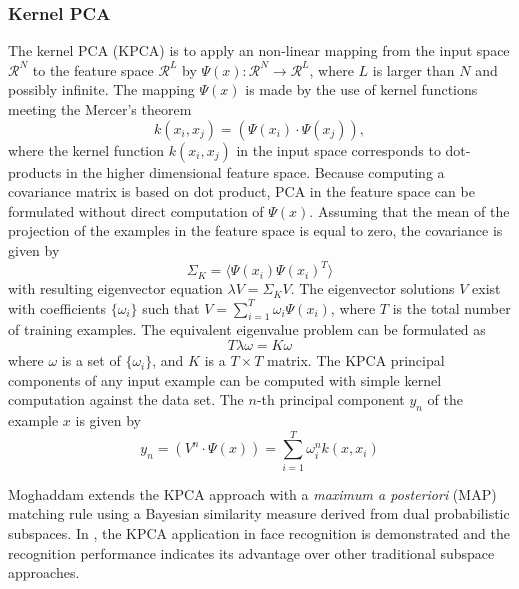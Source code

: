 \subsubsection{Kernel PCA}
The kernel PCA (KPCA) \cite{Scholkopf1998} is to apply an non-linear mapping from the input space $\mathcal{R}^N$ to the feature space $\mathcal{R}^L$ by $\Psi(x): \mathcal{R}^N \rightarrow \mathcal{R}^L$, where $L$ is larger than $N$ and possibly infinite. The mapping $\Psi(x)$ is made by the use of kernel functions meeting the Mercer's theorem \cite{Vapnik1995}
\begin{equation}
 k(x_i,x_j)= (\Psi(x_i)\cdot \Psi(x_j)),
\end{equation}
where the kernel function $k(x_i,x_j)$ in the input space corresponds to dot-products in the higher dimensional feature space. Because computing a covariance matrix is based on dot product, PCA in the feature space can be formulated without direct computation of $\Psi(x)$. Assuming that the mean of the projection of the examples in the feature space is equal to zero, the covariance is given by
\begin{equation}
 \Sigma_K = \langle \Psi(x_i) \Psi(x_i)^T  \rangle
\end{equation}
with resulting eigenvector equation $\lambda V= \Sigma_K V$. The eigenvector solutions $V$ exist with coefficients $\{\omega_i\}$ such that $V=\sum_{i=1}^{T}\omega_i \Psi(x_i)$, where $T$ is the total number of training examples. The equivalent eigenvalue problem can be formulated as
\begin{equation}
 T \lambda \omega = K \omega
\end{equation}
where $\omega$ is a set of $\{\omega_i\}$, and $K$ is a $T\times T$ matrix. The KPCA principal components of any input example can be computed with simple kernel computation against the data set. The $n$-th principal component $y_n$ of the example $x$ is given by
\begin{equation}
 y_n = ( V^n \cdot \Psi(x)) = \sum_{i=1}^T \omega_i^n k(x,x_i)
\end{equation}

Moghaddam \cite{Moghaddam2002} extends the KPCA approach with a \textit{maximum a posteriori} (MAP) matching rule using a Bayesian similarity measure derived from dual probabilistic subspaces. In \cite{Zhou2004}, the KPCA application in face recognition is demonstrated and the recognition performance indicates its advantage over other traditional subspace approaches.
